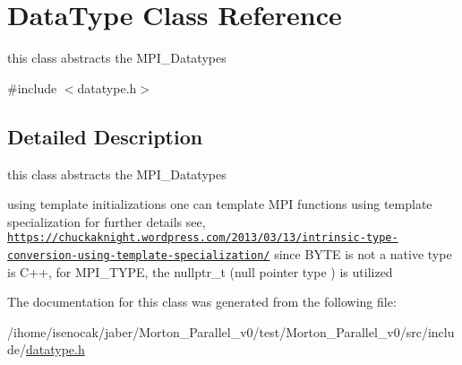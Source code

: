 \hypertarget{classDataType}{}\section{Data\+Type Class Reference}
\label{classDataType}


this class abstracts the M\+P\+I\+\_\+\+Datatypes  




{\ttfamily \#include $<$datatype.\+h$>$}



\subsection{Detailed Description}
this class abstracts the M\+P\+I\+\_\+\+Datatypes 

using template initializations one can template M\+PI functions using template specialization for further details see, \href{https://chuckaknight.wordpress.com/2013/03/13/intrinsic-type-conversion-using-template-specialization/}{\tt https\+://chuckaknight.\+wordpress.\+com/2013/03/13/intrinsic-\/type-\/conversion-\/using-\/template-\/specialization/} since B\+Y\+TE is not a native type is C++, for M\+P\+I\+\_\+\+T\+Y\+PE, the nullptr\+\_\+t (null pointer type ) is utilized 

The documentation for this class was generated from the following file\+:\begin{DoxyCompactItemize}
\item 
/ihome/isenocak/jaber/\+Morton\+\_\+\+Parallel\+\_\+v0/test/\+Morton\+\_\+\+Parallel\+\_\+v0/src/include/\mbox{\hyperlink{datatype_8h}{datatype.\+h}}\end{DoxyCompactItemize}
